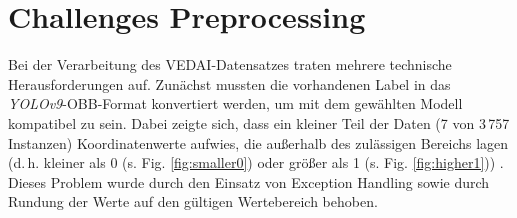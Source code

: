  


\section{Challenges Preprocessing}
Bei der Verarbeitung des VEDAI-Datensatzes traten mehrere technische Herausforderungen auf. 
Zunächst mussten die vorhandenen Label in das \textit{YOLOv9}-OBB-Format konvertiert werden, um mit dem gewählten Modell kompatibel zu sein. 
Dabei zeigte sich, dass ein kleiner Teil der Daten (7 von 3\,757 Instanzen) Koordinatenwerte aufwies, die außerhalb des zulässigen Bereichs lagen (d.\,h. kleiner als 0 (s. Fig. \ref{fig:smaller0}) oder größer als 1 (s. Fig. \ref{fig:higher1})) . 
Dieses Problem wurde durch den Einsatz von Exception Handling sowie durch Rundung der Werte auf den gültigen Wertebereich behoben. 

